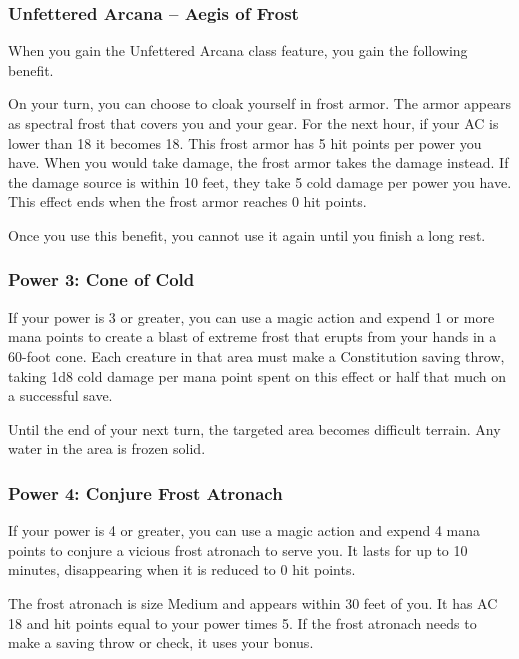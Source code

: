 \documentclass[12pt,letterpaper,twocolumn,openany,nodeprecatedcode,bg=none]{dndbook}
\begin{document}
\subsubsection{Unfettered Arcana -- Aegis of
Frost}\label{unfettered-arcana-aegis-of-frost}

When you gain the Unfettered Arcana class feature, you gain the
following benefit.

On your turn, you can choose to cloak yourself in frost armor. The armor
appears as spectral frost that covers you and your gear. For the next
hour, if your AC is lower than 18 it becomes 18. This frost armor has 5
hit points per power you have. When you would take damage, the frost
armor takes the damage instead. If the damage source is within 10 feet,
they take 5 cold damage per power you have. This effect ends when the
frost armor reaches 0 hit points.

Once you use this benefit, you cannot use it again until you finish a
long rest.

\subsubsection{Power 3: Cone of Cold}\label{power-3-cone-of-cold}

If your power is 3 or greater, you can use a magic action and expend 1
or more mana points to create a blast of extreme frost that erupts from
your hands in a 60-foot cone. Each creature in that area must make a
Constitution saving throw, taking 1d8 cold damage per mana point spent
on this effect or half that much on a successful save.

Until the end of your next turn, the targeted area becomes difficult
terrain. Any water in the area is frozen solid.

\subsubsection{Power 4: Conjure Frost
Atronach}\label{power-4-conjure-frost-atronach}

If your power is 4 or greater, you can use a magic action and expend 4
mana points to conjure a vicious frost atronach to serve you. It lasts
for up to 10 minutes, disappearing when it is reduced to 0 hit points.

The frost atronach is size Medium and appears within 30 feet of you. It
has AC 18 and hit points equal to your power times 5. If the frost
atronach needs to make a saving throw or check, it uses your bonus.
\end{document}

